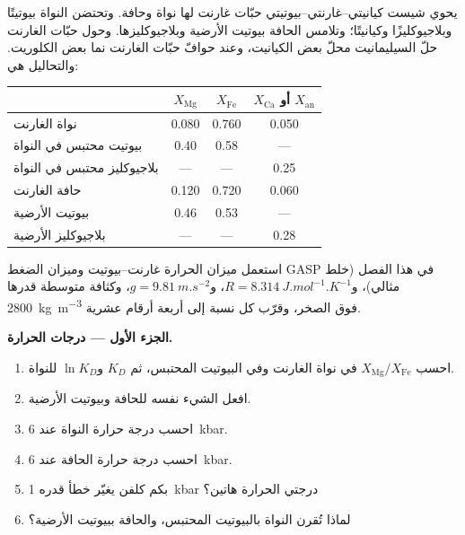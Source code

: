 \begin{problem}
\label{pb:b2:pt-paths:1}
يحوي شيست كيانيتي--غارنتي--بيوتيتي حبّات غارنت لها نواة وحافة. وتحتضن النواة
بيوتيتًا وبلاجيوكليزًا وكيانيتًا؛ وتلامس الحافة بيوتيت الأرضية وبلاجيوكليزها.
وحول حبّات الغارنت حلّ السيليمانيت محلّ بعض الكيانيت، وعند حوافّ
حبّات الغارنت نما بعض الكلوريت. والتحاليل هي:
\begin{center}
\small
\begin{tabular}{@{}lccc@{}}
\hline
 & $X_{\text{Mg}}$ & $X_{\text{Fe}}$ & $X_{\text{Ca}}$ أو $X_{\text{an}}$\\
\hline
نواة الغارنت & 0.080 & 0.760 & 0.050\\
بيوتيت محتبس في النواة & 0.40 & 0.58 & ---\\
بلاجيوكليز محتبس في النواة & --- & --- & 0.25\\
حافة الغارنت & 0.120 & 0.720 & 0.060\\
بيوتيت الأرضية & 0.46 & 0.53 & ---\\
بلاجيوكليز الأرضية & --- & --- & 0.28\\
\hline
\end{tabular}
\end{center}
استعمل ميزان الحرارة غارنت--بيوتيت وميزان الضغط GASP في هذا الفصل (خلط مثالي)،
و$R = \qty{8.314}{J.mol^{-1}.K^{-1}}$، و$g = \qty{9.81}{m.s^{-2}}$، وكثافة متوسطة قدرها
\qty{2800}{kg.m^{-3}} فوق الصخر، وقرّب كل نسبة إلى أربعة أرقام عشرية.

\noindent\textbf{الجزء الأول --- درجات الحرارة.}
\begin{enumerate}
\item احسب $X_{\text{Mg}}/X_{\text{Fe}}$ في نواة الغارنت وفي البيوتيت
المحتبس، ثم $K_D$ و$\ln K_D$ للنواة.
\item افعل الشيء نفسه للحافة وبيوتيت الأرضية.
\item احسب درجة حرارة النواة عند \qty{6}{kbar}.
\item احسب درجة حرارة الحافة عند \qty{6}{kbar}.
\item بكم كلفن يغيّر خطأ قدره \qty{1}{kbar} درجتي الحرارة هاتين؟
\item لماذا تُقرن النواة بالبيوتيت المحتبس، والحافة ببيوتيت
الأرضية؟
\end{enumerate}


\end{problem}
